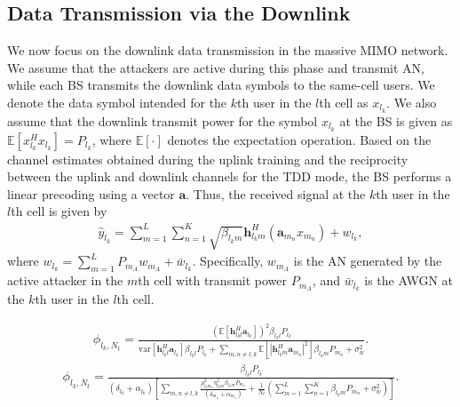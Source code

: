 \documentclass[conference]{IEEEtran}
\begin{document}
\subsection{Data Transmission via the Downlink}

We now focus on the downlink data transmission in the massive MIMO network. We assume that the attackers are active during this phase and transmit AN, while each BS transmits the downlink data symbols to the same-cell users. We denote the data symbol intended for the $k$th user in the $l$th cell as $x_{l_{k}}$. We also assume that the downlink transmit power for the symbol $x_{l_{k}}$ at the BS is given as $\mathbb{E}\left[x_{l_{k}}^H{x}_{l_{k}}\right] = P_{l_{k}}$, where $\mathbb{E}[\cdot]$ denotes the expectation operation. Based on the channel estimates obtained during the uplink training and the reciprocity between the uplink and downlink channels for the TDD mode, the BS performs a linear precoding using a vector $\mathbf{a}$. Thus, the received signal at the $k$th user in the $l$th cell is given by
\begin{align}\label{rec_initial}
\hat{y}_{l_{k}}=
\sum_{m=1}^{L}\sum_{n=1}^{K}\sqrt{\beta_{l_{k}m}}\mathbf{h}_{l_{k}m}^{H}\left(\mathbf{a}_{m_{n}}x_{m_{n}}\right)+w_{l_{k}},
\end{align}
where $w_{l_{k}}=\sum_{m=1}^L P_{m_{A}}w_{m_{A}} + \bar{w}_{l_{k}}$. Specifically, $w_{m_{A}}$ is the AN generated by the active attacker in the $m$th cell with transmit power $P_{m_{A}}$, and $\bar{w}_{l_{k}}$ is the AWGN at the $k$th user in the $l$th cell. \begin{figure*}[!t]
\begin{align}\label{long_exp}
\phi_{l_{k},N_{t}}=\frac{\left(\mathbb{E}\left[{\mathbf{h}_{l_{k}l}^{H}\mathbf{a}_{l_{k}}}\right]\right)^2\beta_{l_{k}l}P_{l_{k}}}
{\textrm{var}\left[{\mathbf{h}_{l_{k}l}^{H}\mathbf{a}_{l_{k}}}\right]\beta_{l_{k}l}P_{l_{k}} + \sum_{m,n{}\neq{}l,k}\mathbb{E}\left[|{\mathbf{h}_{l_{k}m}^{H}\mathbf{a}_{m_{n}}}|^{2}\right]\beta_{l_{k}m}P_{m_{n}} + \sigma_{w}^2}. \tag{5}
\end{align}
\begin{align}\label{SINR}
\phi_{l_{k},N_{t}}=\frac{\beta_{l_{k}l}P_{l_{k}}}{\left(\delta_{l_{k}}+\alpha_{l_{k}}\right)\left[\sum\limits_{m,n\neq{}l,k} \frac{\rho_{l_{k}m_{n}}^{2}\eta_{l_{k}m}^2\beta_{l_{k}m}P_{m_{n}}}{\left(\delta_{m_{n}}+ \alpha_{m_{n}}\right)}+\frac{1}{N_{t}}\left(\sum_{m=1}^{L}\sum_{n=1}^{K}\beta_{l_{k}m}P_{m_{n}} + \sigma_{w}^2\right)
\right]}. \tag{11}
\end{align}
\end{figure*}
\end{document}
